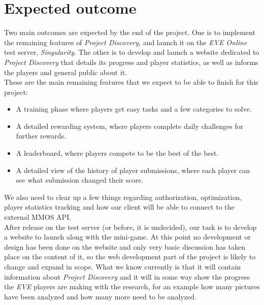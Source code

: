 \section{Expected outcome}\label{sec:expected_outcome}

Two main outcomes are expected by the end of the project. One is to implement the remaining features of \emph{Project Discovery}, and launch it on the \emph{EVE Online} test server, \emph{Singularity}. The other is to develop and launch a website dedicated to \emph{Project Discovery} that details its progress and player statistics, as well as informs the players and general public about it.\\

These are the main remaining features that we expect to be able to finish for this project:
\begin{itemize}
  \item A training phase where players get easy tasks and a few categories to solve.
  \item A detailed rewarding system, where players complete daily challenges for further rewards.
  \item A leaderboard, where players compete to be the best of the best.
  \item A detailed view of the history of player submissions, where each player can see what submission changed their score.
\end{itemize}

We also need to clear up a few things regarding authorization, optimization, player statistics tracking and how our client will be able to connect to the external MMOS API.\\

After release on the test server (or before, it is undecided), our task is to develop a website to launch along with the mini-game. At this point no development or design has been done on the website and only very basic discussion has taken place on the content of it, so the web development part of the project is likely to change and expand in scope. What we know currently is that it will contain information about \emph{Project Discovery} and it will in some way show the progress the \emph{EVE} players are making with the research, for an example how many pictures have been analyzed and how many more need to be analyzed.
